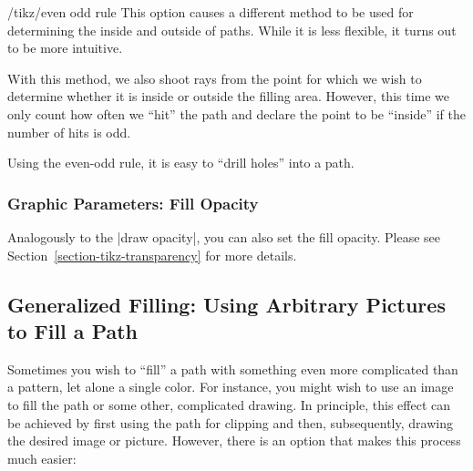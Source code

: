 \begin{key}{/tikz/even odd rule}
    This option causes a different method to be used for determining the inside
    and outside of paths. While it is less flexible, it turns out to be more
    intuitive.

    With this method, we also shoot rays from the point for which we wish to
    determine whether it is inside or outside the filling area. However, this
    time we only count how often we ``hit'' the path and declare the point to
    be ``inside'' if the number of hits is odd.

    Using the even-odd rule, it is easy to ``drill holes'' into a path.
\begin{codeexample}[]
\end{codeexample}
\end{key}


\subsubsection{Graphic Parameters: Fill Opacity}
\label{section-fill-opacity}

Analogously to the |draw opacity|, you can also set the fill opacity. Please
see Section~\ref{section-tikz-transparency} for more details.


\subsection{Generalized Filling: Using Arbitrary Pictures to Fill a Path}

Sometimes you wish to ``fill'' a path with something even more complicated than
a pattern, let alone a single color. For instance, you might wish to use an
image to fill the path or some other, complicated drawing. In principle, this
effect can be achieved by first using the path for clipping and then,
subsequently, drawing the desired image or picture. However, there is an option
that makes this process much easier:

